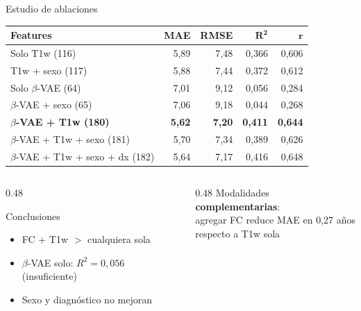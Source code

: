 \documentclass[aspectratio=169, 11pt]{beamer}
\newcommand{\highlight}[1]{\textcolor{uncaccent}{\textbf{#1}}}
\begin{document}
\begin{frame}{Estudio de ablaciones}
  \centering
  {\footnotesize
  \begin{tabular}{lrrrr}
    \toprule
    \textbf{Features} & \textbf{MAE} & \textbf{RMSE} & $\boldsymbol{R^2}$ & $\boldsymbol{r}$ \\
    \midrule
    Solo T1w (116) & 5,89 & 7,48 & 0,366 & 0,606 \\
    T1w + sexo (117) & 5,88 & 7,44 & 0,372 & 0,612 \\
    Solo $\beta$-VAE (64) & 7,01 & 9,12 & 0,056 & 0,284 \\
    $\beta$-VAE + sexo (65) & 7,06 & 9,18 & 0,044 & 0,268 \\
    \rowcolor{unclight}
    \textbf{$\beta$-VAE + T1w (180)} & \textbf{5,62} & \textbf{7,20} & \textbf{0,411} & \textbf{0,644} \\
    $\beta$-VAE + T1w + sexo (181) & 5,70 & 7,34 & 0,389 & 0,626 \\
    $\beta$-VAE + T1w + sexo + dx (182) & 5,64 & 7,17 & 0,416 & 0,648 \\
    \bottomrule
  \end{tabular}}

  \vspace{0.15cm}
  \begin{columns}[T]
    \begin{column}{0.48\textwidth}
      \begin{block}{Conclusiones}
        \begin{itemize}
          \item FC + T1w \highlight{$>$} cualquiera sola
          \item $\beta$-VAE solo: $R^2 = 0{,}056$ (insuficiente)
          \item Sexo y diagnóstico no mejoran
        \end{itemize}
      \end{block}
    \end{column}
    \begin{column}{0.48\textwidth}
      \centering
      {\small Modalidades \highlight{complementarias}:\\
      agregar FC reduce MAE en 0,27 años\\respecto a T1w sola}
    \end{column}
  \end{columns}
\end{frame}
\end{document}
